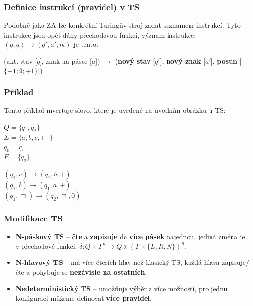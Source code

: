 \subsubsection{Definice instrukcí (pravidel) v TS}
Podobně jako ZA lze konkrétní Turingův stroj zadat seznamem instrukcí. Tyto instrukce jsou opět dány přechodovou
funkcí, význam instrukce: $(q, a) \rightarrow (q', a', m)$ je tento:
\begin{center}
(akt. stav [$q$], znak na pásce [$a$]) $\rightarrow$ (\textbf{nový stav} [$q'$], \textbf{nový znak} [$a'$], \textbf{posun} [$\{-1;0;+1\}$])
\end{center}
\subsubsection{Příklad}
Tento příklad invertuje slovo, které je uvedené na úvodním obrázku u TS:
\begin{center}
\begin{minipage}[t]{0.3\textwidth}
$Q = \{q_1, q_2\}$\\
$\Sigma = \{a, b, c, \Box\}$\\
$q_0 = q_1$\\
$F = \{q_2\}$\\
\end{minipage}
\begin{minipage}[t]{0.3\textwidth}
$(q_1, a) \rightarrow (q_1, b, +)$\\
$(q_1, b) \rightarrow (q_1, a, +)$\\
$(q_1, \Box) \rightarrow (q_2, \Box, 0)$
\end{minipage}
\end{center}

\subsubsection{Modifikace TS}
\begin{itemize}
\item \textbf{N-páskový TS} -- \textbf{čte} a \textbf{zapisuje} do \textbf{více pásek} najednou, jediná změna je v přechodové funkci: $\delta :Q\times \Gamma ^{n}\rightarrow Q\times (\Gamma \times \{L,R,N\})^{n}$.
\item \textbf{N-hlavový TS} -- má více čtecích hlav než klasický TS, každá hlava zapisuje/čte a pohybuje se \textbf{nezávisle na ostatních}.
\item \textbf{Nedeterministický TS} -- umožňuje výběr z více možností, pro jednu konfiguraci můžeme definovat \textbf{více pravidel}.
\end{itemize}

